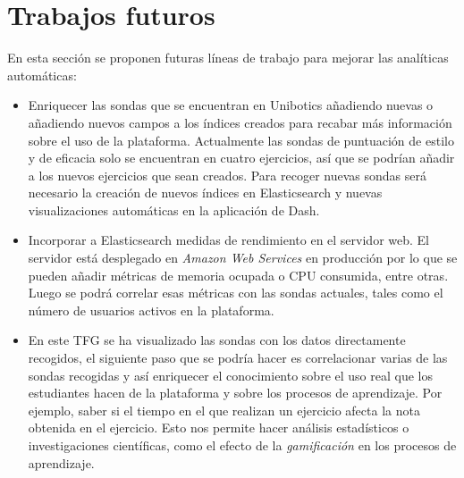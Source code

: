 	\section{Trabajos futuros} 
	\label{sec:trabajos_futuros} 

		En esta sección se proponen futuras líneas de trabajo para mejorar las analíticas automáticas:

		\begin{itemize}
\item Enriquecer las sondas que se encuentran en Unibotics añadiendo nuevas o añadiendo nuevos campos a los índices creados para recabar más información sobre el uso de la plataforma. Actualmente las sondas de puntuación de estilo y de eficacia solo se encuentran en cuatro ejercicios, así que se podrían añadir a los nuevos ejercicios que sean creados. Para recoger nuevas sondas será necesario la creación de nuevos índices en Elasticsearch y nuevas visualizaciones automáticas en la aplicación de Dash.
\item Incorporar a Elasticsearch medidas de rendimiento en el servidor web. El servidor está desplegado en \textit{Amazon Web Services} en producción por lo que se pueden añadir métricas de memoria ocupada o CPU consumida, entre otras. Luego se podrá correlar esas métricas con las sondas actuales, tales como el número de usuarios activos en la plataforma.
\item En este TFG se ha visualizado las sondas con los datos directamente recogidos, el siguiente paso que se podría hacer es correlacionar varias de las sondas recogidas y así enriquecer el conocimiento sobre el uso real que los estudiantes hacen de la plataforma y sobre los procesos de aprendizaje. Por ejemplo, saber si el tiempo en el que realizan un ejercicio afecta la nota obtenida en el ejercicio. Esto nos permite hacer análisis estadísticos o investigaciones científicas, como el efecto de la \textit{gamificación} en los procesos de aprendizaje.\\
		\end{itemize}